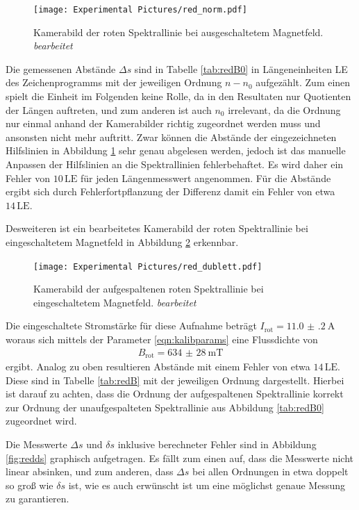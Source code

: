 \begin{figure}[H]
  \centering
  \texttt{[image: Experimental Pictures/red\_norm.pdf]}
  \caption{Kamerabild der roten Spektrallinie bei ausgeschaltetem Magnetfeld. \textit{bearbeitet}}
  \label{fig:redB0}
\end{figure}

Die gemessenen Abstände $\Delta s$ sind in Tabelle \ref{tab:redB0} in Längeneinheiten LE
des Zeichenprogramms mit der jeweiligen Ordnung $n-n_0$ aufgezählt. Zum einen
spielt die Einheit im Folgenden keine Rolle, da in den Resultaten nur Quotienten der Längen auftreten,
und zum anderen ist auch $n_0$ irrelevant, da die Ordnung nur einmal anhand der Kamerabilder richtig
zugeordnet werden muss und ansonsten nicht mehr auftritt. Zwar können die Abstände der eingezeichneten
Hilfslinien in Abbildung \ref{fig:redB0} sehr genau abgelesen werden, jedoch ist das manuelle
Anpassen der Hilfslinien an die Spektrallinien fehlerbehaftet. Es wird daher ein Fehler von
$10 \, \text{LE}$ für jeden Längenmesswert angenommen. Für die Abstände ergibt sich durch
Fehlerfortpflanzung der Differenz damit ein Fehler von etwa $14 \, \text{LE}$.

Desweiteren ist ein bearbeitetes Kamerabild der roten Spektrallinie bei eingeschaltetem Magnetfeld in Abbildung
\ref{fig:redB} erkennbar.

\begin{figure}[H]
  \centering
  \texttt{[image: Experimental Pictures/red\_dublett.pdf]}
  \caption{Kamerabild der aufgespaltenen roten Spektrallinie bei eingeschaltetem Magnetfeld. \textit{bearbeitet}}
  \label{fig:redB}
\end{figure}

Die eingeschaltete Stromstärke für diese Aufnahme beträgt $I_\text{rot} = \SI{11.0(2)}{\ampere}$
woraus sich mittels der Parameter \eqref{eqn:kalibparams} eine Flussdichte von
\begin{align}
  B_\text{rot} = \SI{634(28)}{\milli\tesla}
\end{align}
ergibt. Analog zu oben resultieren Abstände mit einem Fehler von etwa $14 \, \text{LE}$. Diese sind
in Tabelle \ref{tab:redB} mit der jeweiligen Ordnung dargestellt. Hierbei ist darauf zu achten, dass
die Ordnung der aufgespaltenen Spektrallinie korrekt zur Ordnung der unaufgespalteten Spektrallinie
aus Abbildung \ref{tab:redB0} zugeordnet wird.

Die Messwerte $\Delta s$ und $\delta s$ inklusive berechneter Fehler sind in Abbildung \ref{fig:redds} graphisch
aufgetragen. Es fällt zum einen auf, dass die Messwerte nicht linear absinken,
und zum anderen, dass $\Delta s$ bei allen Ordnungen in etwa doppelt so groß wie $\delta s$
ist, wie es auch erwünscht ist um eine möglichst genaue Messung zu garantieren.

